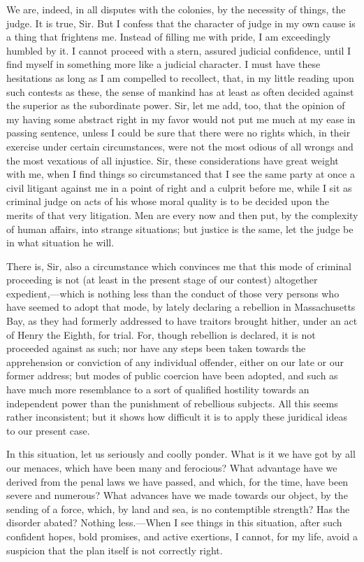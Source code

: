 We are, indeed, in all disputes with the colonies, by the necessity of things, the judge. It is true, Sir. But I confess that the character of judge in my own cause is a thing that frightens me. Instead of filling me with pride, I am exceedingly humbled by it. I cannot proceed with a stern, assured judicial confidence, until I find myself in something more like a judicial character. I must have these hesitations as long as I am compelled to recollect, that, in my little reading upon such contests as these, the sense of mankind has at least as often decided against the superior as the subordinate power. Sir, let me add, too, that the opinion of my having some abstract right in my favor would not put me much at my ease in passing sentence, unless I could be sure that there were no rights which, in their exercise under certain circumstances, were not the most odious of all wrongs and the most vexatious of all injustice. Sir, these considerations have great weight with me, when I find things so circumstanced that I see the same party at once a civil litigant against me in a point of right and a culprit before me, while I sit as criminal judge on acts of his whose moral quality is to be decided upon the merits of that very litigation. Men are every now and then put, by the complexity of human affairs, into strange situations; but justice is the same, let the judge be in what situation he will.

There is, Sir, also a circumstance which convinces me that this mode of criminal proceeding is not (at least in the present stage of our contest) altogether expedient,—which is nothing less than the conduct of those very persons who have seemed to adopt that mode, by lately declaring a rebellion in Massachusetts Bay, as they had formerly addressed to have traitors brought hither, under an act of Henry the Eighth, for trial. For, though rebellion is declared, it is not proceeded against as such; nor have any steps been taken towards the apprehension or conviction of any individual offender, either on our late or our former address; but modes of public coercion have been adopted, and such as have much more resemblance to a sort of qualified hostility towards an independent power than the punishment of rebellious subjects. All this seems rather inconsistent; but it shows how difficult it is to apply these juridical ideas to our present case.

In this situation, let us seriously and coolly ponder. What is it we have got by all our menaces, which have been many and ferocious? What advantage have we derived from the penal laws we have passed, and which, for the time, have been severe and numerous? What advances have we made towards our object, by the sending of a force, which, by land and sea, is no contemptible strength? Has the disorder abated? Nothing less.—When I see things in this situation, after such confident hopes, bold promises, and active exertions, I cannot, for my life, avoid a suspicion that the plan itself is not correctly right.

